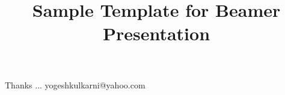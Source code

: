\documentclass[xcolor=dvipsnames,compress,t,pdf,9pt]{beamer}
\title[\insertframenumber /\inserttotalframenumber]{Sample Template for Beamer Presentation}
\begin{document}
	\begin{frame}
	\titlepage
%
	\end{frame}
	
	
	
	\begin{frame}[c]{}
	Thanks ...
	\vspace{5mm}
	yogeshkulkarni@yahoo.com
	\end{frame}
\end{document}
